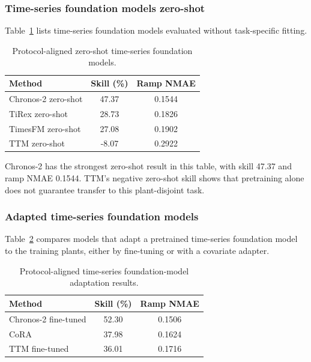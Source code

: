 \subsubsection{Time-series foundation models zero-shot}

Table~\ref{tab:results-foundation-transfer} lists time-series foundation models evaluated without task-specific fitting.

\begin{table}[htbp]\centering
\begin{tabular}{lcc}\hline
Method & Skill (\%) & Ramp NMAE \\\hline
Chronos-2 zero-shot & 47.37 & 0.1544 \\
TiRex zero-shot & 28.73 & 0.1826 \\
TimesFM zero-shot & 27.08 & 0.1902 \\
TTM zero-shot & -8.07 & 0.2922 \\\hline
\end{tabular}
\caption{Protocol-aligned zero-shot time-series foundation models.}\label{tab:results-foundation-transfer}
\end{table}

Chronos-2 has the strongest zero-shot result in this table, with skill 47.37 and ramp NMAE 0.1544. TTM's negative zero-shot skill shows that pretraining alone does not guarantee transfer to this plant-disjoint task.

\subsubsection{Adapted time-series foundation models}

Table~\ref{tab:results-foundation-adaptation} compares models that adapt a pretrained time-series foundation model to the training plants, either by fine-tuning or with a covariate adapter.

\begin{table}[htbp]\centering
\begin{tabular}{lcc}\hline
Method & Skill (\%) & Ramp NMAE \\\hline
Chronos-2 fine-tuned & 52.30 & 0.1506 \\
CoRA & 37.98 & 0.1624 \\
TTM fine-tuned & 36.01 & 0.1716 \\\hline
\end{tabular}
\caption{Protocol-aligned time-series foundation-model adaptation results.}\label{tab:results-foundation-adaptation}
\end{table}

